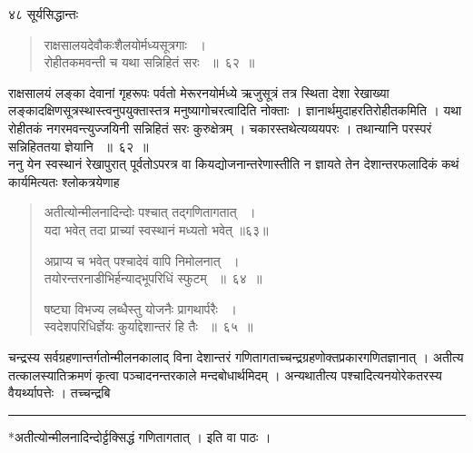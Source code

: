 \documentclass[11pt, openany]{book}
\begin{document}
\newpage

\noindent४८ \hspace{4cm} सूर्यसिद्धान्तः
\vspace{1cm}
\begin{quote}

{\ssi राक्षसालयदेवौकःशैलयोर्मध्यसूत्रगाः ~।\\
रोहीतकमवन्ती च यथा सन्निहितं सरः ~॥~६२~॥ }
\end{quote}
\begin{sloppypar}
राक्षसालयं लङ्का देवानां गृहरूपः पर्वतो मेरूरनयोर्मध्ये ऋजुसूत्रं तत्र स्थिता देशा रेखाख्या लङ्कादक्षिणसूत्रस्थास्त्वनुपयुक्तास्तत्र मनुष्यागोचरत्वादिति नोक्ताः । ज्ञानार्थमुदाहरति\textendash रोहीतकमिति । यथा रोहीतकं नगरमवन्त्युज्जयिनी सन्निहितं सरः कुरुक्षेत्रम् । चकारस्तथेत्यव्ययपरः । तथान्यानि परस्परं सन्निहिततया ज्ञेयानि ~॥~६२~॥\\
\noindent ननु येन स्वस्थानं रेखापुरात् पूर्वतोऽपरत्र वा कियद्योजनान्तरेणास्तीति न ज्ञायते तेन देशान्तरफलादिकं कथं कार्यमित्यतः श्लोकत्रयेणाह\textendash
\end{sloppypar}
\begin{quote}

{\ssi *अतीत्योन्मीलनादिन्दोः पश्चात् तद्गणितागतात् ~।\\
यदा भवेत् तदा प्राच्यां स्वस्थानं मध्यतो भवेत् ॥६३॥

अप्राप्य च भवेत् पश्चादेवं वापि निमोलनात् ~।\\
तयोरन्तरनाडीभिर्हन्याद्भूपरिधिं स्फुटम् ~॥~६४~॥

षष्ट्या विभज्य लब्धैस्तु योजनैः प्रागथार्परैः ~।\\
स्वदेशपरिधिर्ज्ञेयः कुर्याद्देशान्तरं हि तैः ~॥~६५~॥ }
\end{quote}
\begin{sloppypar}
चन्द्रस्य सर्वग्रहणान्तर्गतोन्मीलनकालाद् विना देशान्तरं गणितागताच्चन्द्रग्रहणोक्तप्रकारगणितज्ञानात् । अतीत्य तत्कालस्यातिक्रमणं कृत्वा पञ्चादनन्तरकाले मन्दबोधार्थमिदम् । अन्यथातीत्य पश्चादित्यनयोरेकतरस्य वैयर्थ्यापत्तेः । तच्चन्द्रबि\textendash
\end{sloppypar}

\noindent \rule{\linewidth}{.5pt}

\begin{center}
*अतीत्योन्मीलनादिन्दोर्ट्टक्सिद्धं गणितागतात् । इति वा पाठः ।
\end{center}
\end{document}
